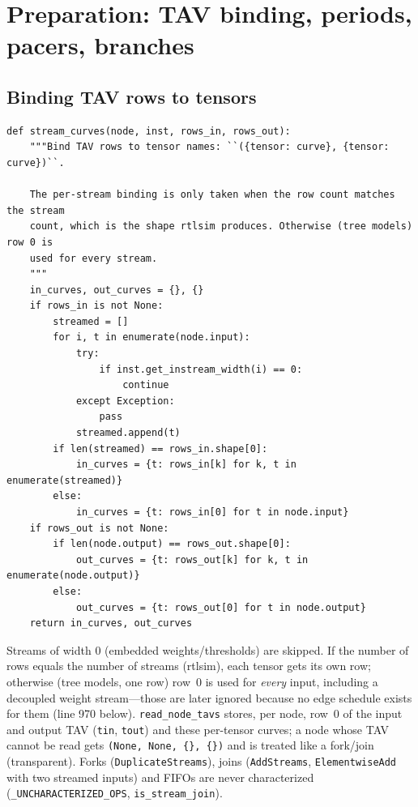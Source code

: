 \documentclass[10pt,a4paper]{article}
\newcommand{\code}[1]{\texttt{#1}}
\begin{document}
\section{Preparation: TAV binding, periods, pacers, branches}\label{sec:prep}

\subsection{Binding TAV rows to tensors}

\begin{lstlisting}[firstnumber=260,title={\texttt{src/finn/transformation/fpgadataflow/derive\_characteristic.py}, lines 260--286}]
def stream_curves(node, inst, rows_in, rows_out):
    """Bind TAV rows to tensor names: ``({tensor: curve}, {tensor: curve})``.

    The per-stream binding is only taken when the row count matches the stream
    count, which is the shape rtlsim produces. Otherwise (tree models) row 0 is
    used for every stream.
    """
    in_curves, out_curves = {}, {}
    if rows_in is not None:
        streamed = []
        for i, t in enumerate(node.input):
            try:
                if inst.get_instream_width(i) == 0:
                    continue
            except Exception:
                pass
            streamed.append(t)
        if len(streamed) == rows_in.shape[0]:
            in_curves = {t: rows_in[k] for k, t in enumerate(streamed)}
        else:
            in_curves = {t: rows_in[0] for t in node.input}
    if rows_out is not None:
        if len(node.output) == rows_out.shape[0]:
            out_curves = {t: rows_out[k] for k, t in enumerate(node.output)}
        else:
            out_curves = {t: rows_out[0] for t in node.output}
    return in_curves, out_curves
\end{lstlisting}

Streams of width 0 (embedded weights/thresholds) are skipped. If the number of
rows equals the number of streams (rtlsim), each tensor gets its own row;
otherwise (tree models, one row) row~0 is used for \emph{every} input, including
a decoupled weight stream---those are later ignored because no edge schedule
exists for them (line 970 below). \code{read\_node\_tavs} stores, per node, row~0 of
the input and output TAV (\code{tin}, \code{tout}) and these per-tensor curves; a
node whose TAV cannot be read gets \code{(None, None, \{\}, \{\})} and is treated
like a fork/join (transparent). Forks (\code{DuplicateStreams}), joins
(\code{AddStreams}, \code{ElementwiseAdd} with two streamed inputs) and FIFOs are
never characterized (\code{\_UNCHARACTERIZED\_OPS}, \code{is\_stream\_join}).
\end{document}
